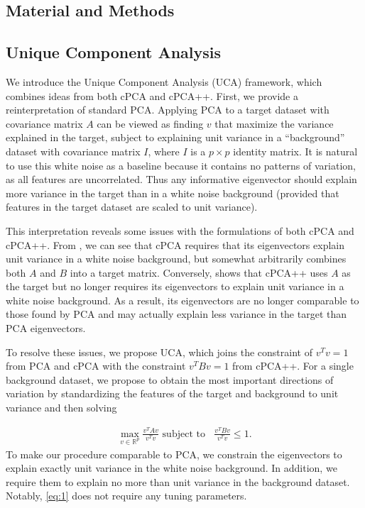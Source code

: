 \documentclass[nocrop]{bioinfo}
\begin{document}
\begin{methods}
\section{Material and Methods\label{sec:method}}
\subsection{Unique Component Analysis}
We introduce the Unique Component Analysis (UCA) framework, which combines ideas from both cPCA and cPCA++. First, we provide a reinterpretation of standard PCA. Applying PCA to a target dataset with covariance matrix $A$ can be viewed as finding $v$ that maximize the variance explained in the target, subject to explaining unit variance in a ``background'' dataset with covariance matrix $I$, where $I$ is a $p \times p$ identity matrix. It is natural to use this white noise as a baseline because it contains no patterns of variation, as all features are uncorrelated. Thus any informative eigenvector should explain more variance in the target than in a white noise background (provided that features in the target dataset are scaled to unit variance).

This interpretation reveals some issues with the formulations of both cPCA and cPCA++. From \vphantom{\eqref{eq:cpca}}, we can see that cPCA requires that its eigenvectors explain unit variance in a white noise background, but somewhat arbitrarily combines both $A$ and $B$ into a target matrix. Conversely, \vphantom{\eqref{eq:cpca++}} shows that cPCA++ uses $A$ as the target but no longer requires its eigenvectors to explain unit variance in a white noise background. As a result, its eigenvectors are no longer comparable to those found by PCA and may actually explain less variance in the target than PCA eigenvectors.

To resolve these issues, we propose UCA, which joins the constraint of $v^T  v = 1$ from PCA and cPCA with the constraint $v^T Bv = 1$ from cPCA++. For a single background dataset, we propose to obtain the most important directions of variation by standardizing the features of the target and background to unit variance and then solving

\begin{equation*}
  \label{eq:1}
  \begin{aligned}
  \max_{v\in \mathbb{R}^p}{\frac{v^TAv}{v^T v}} \text{ subject to }\;\; \frac{v^TBv}{v^T v} \leq 1.
  \end{aligned}
\end{equation*}
To make our procedure comparable to PCA, we constrain the eigenvectors to explain exactly unit variance in the white noise background. In addition, we require them to explain no more than unit variance in the background dataset. Notably, \eqref{eq:1} does not require any tuning parameters.



\end{methods}
\end{document}
